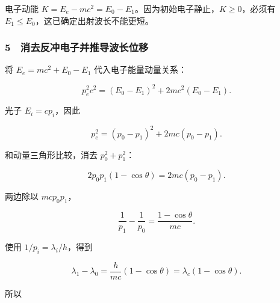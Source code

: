 \documentclass[12pt,a4paper,fontset=fandol]{ctexart}
\begin{document}
电子动能 \(K=E_e-mc^2=E_0-E_1\)。因为初始电子静止，\(K\ge0\)，必须有
\(E_1\le E_0\)，这已确定出射波长不能更短。

\begin{center}
\begin{minipage}{\linewidth}
\centering\begingroup{}
\ifdim\wd\diagrambox>.88\linewidth
\sbox{\diagrambox}{\resizebox{.88\linewidth}{!}{\usebox{\diagrambox}}}\fi
\ifdim\ht\diagrambox>.38\textheight
\resizebox{!}{.38\textheight}{\usebox{\diagrambox}}
\else\usebox{\diagrambox}\fi
\par{}\endgroup\end{minipage}\end{center}

\subsubsection{5　消去反冲电子并推导波长位移}\label{ux6d88ux53bbux53cdux51b2ux7535ux5b50ux5e76ux63a8ux5bfcux6ce2ux957fux4f4dux79fb}

将 \(E_e=mc^2+E_0-E_1\) 代入电子能量动量关系：

\[p_e^2c^2=(E_0-E_1)^2+2mc^2(E_0-E_1).\]

光子 \(E_i=cp_i\)，因此

\[p_e^2=(p_0-p_1)^2+2mc(p_0-p_1).\]

和动量三角形比较，消去 \(p_0^2+p_1^2\)：

\[2p_0p_1(1-\cos\theta)=2mc(p_0-p_1).\]

两边除以 \(mcp_0p_1\)，

\[\frac1{p_1}-\frac1{p_0}=\frac{1-\cos\theta}{mc}.\]

使用 \(1/p_i=\lambda_i/h\)，得到

\[\boxed{\lambda_1-\lambda_0=
\frac h{mc}(1-\cos\theta)=\lambda_c(1-\cos\theta).}\]

所以
\end{document}

